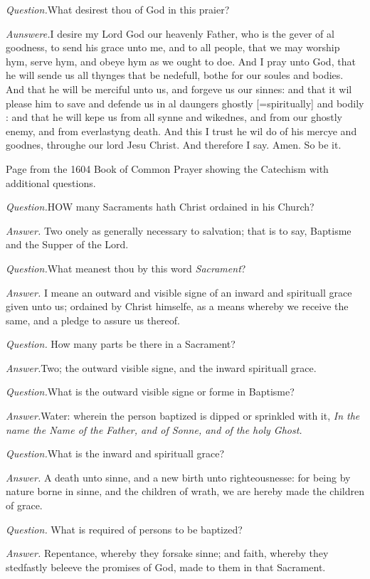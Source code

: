 \emph{Question.}What desirest thou of God in this
praier?

\emph{Aunswere.}I desire my Lord God our heavenly
Father, who is the gever of al goodness, to send his grace unto me, and
to all people, that we may worship hym, serve hym, and obeye hym as we
ought to doe. And I pray unto God, that he will sende us all thynges that
be nedefull, bothe for our soules and bodies. And that he will be merciful
unto us, and forgeve us our sinnes: and that it wil please him to save
and defende us in al daungers ghostly [=spiritually]
and bodily : and that he will kepe us from all synne and wikednes, and
from our ghostly enemy, and from everlastyng death. And this I trust he
wil do of his mercye and goodnes, throughe our lord Jesu Christ. And therefore
I say. Amen. So be it.

Page
from the 1604 Book of Common Prayer showing the Catechism with additional
questions.

\emph{Question.}HOW
many Sacraments hath Christ ordained in his Church? 

\emph{Answer.} Two onely as generally necessary to salvation;
that is to say, Baptisme and the Supper of the Lord. 

\emph{Question.}What meanest thou by this word \emph{Sacrament}?

\emph{Answer.} I meane an outward
and visible signe of an inward and spirituall grace given unto us; ordained
by Christ himselfe, as a means whereby we receive the same, and a pledge
to assure us thereof. 

\emph{Question.} How many parts
be there in a Sacrament? 

\emph{Answer.}Two; the outward visible signe, and the inward
spirituall grace. 

\emph{Question.}What is the outward visible signe or forme
in Baptisme? 

\emph{Answer.}Water: wherein the person baptized is dipped
or sprinkled with it, \emph{In the name the Name of the Father, and of Sonne,
and of the holy Ghost.}

\emph{Question.}What is the inward and spirituall grace?

\emph{Answer.} A death unto
sinne, and a new birth unto righteousnesse: for being by nature borne
in sinne, and the children of wrath, we are hereby made the children of
grace. 

\emph{Question.} What is required
of persons to be baptized? 

\emph{Answer.} Repentance, whereby
they forsake sinne; and faith, whereby they stedfastly beleeve the promises
of God, made to them in that Sacrament. 

